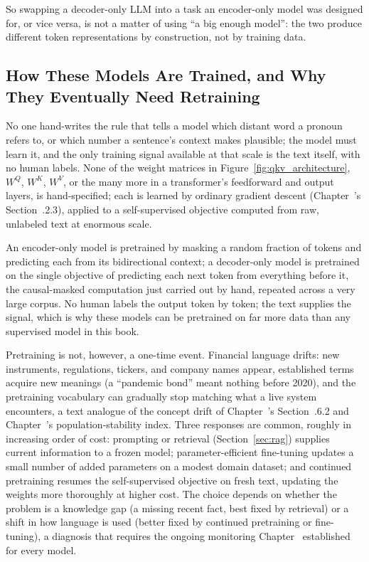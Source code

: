\documentclass[../ai_in_finance]{subfiles}
\begin{document}
So swapping a decoder-only LLM into a task an encoder-only model was designed for, or vice versa, is not a matter of using ``a big enough model'': the two produce different token representations by construction, not by training data.

\subsection{How These Models Are Trained, and Why They Eventually Need Retraining}
\label{sec:transformer-training}

No one hand-writes the rule that tells a model which distant word a pronoun refers to, or which number a sentence's context makes plausible; the model must learn it, and the only training signal available at that scale is the text itself, with no human labels. None of the weight matrices in Figure~\ref{fig:qkv_architecture}, $W^Q$, $W^K$, $W^V$, or the many more in a transformer's feedforward and output layers, is hand-specified; each is learned by ordinary gradient descent (Chapter~'s Section~.2.3), applied to a self-supervised objective computed from raw, unlabeled text at enormous scale.

An encoder-only model is pretrained by masking a random fraction of tokens and predicting each from its bidirectional context; a decoder-only model is pretrained on the single objective of predicting each next token from everything before it, the causal-masked computation just carried out by hand, repeated across a very large corpus. No human labels the output token by token; the text supplies the signal, which is why these models can be pretrained on far more data than any supervised model in this book.

Pretraining is not, however, a one-time event. Financial language drifts: new instruments, regulations, tickers, and company names appear, established terms acquire new meanings (a ``pandemic bond'' meant nothing before 2020), and the pretraining vocabulary can gradually stop matching what a live system encounters, a text analogue of the concept drift of Chapter~'s Section~.6.2 and Chapter~'s population-stability index. Three responses are common, roughly in increasing order of cost: prompting or retrieval (Section~\ref{sec:rag}) supplies current information to a frozen model; parameter-efficient fine-tuning updates a small number of added parameters on a modest domain dataset; and continued pretraining resumes the self-supervised objective on fresh text, updating the weights more thoroughly at higher cost. The choice depends on whether the problem is a knowledge gap (a missing recent fact, best fixed by retrieval) or a shift in how language is used (better fixed by continued pretraining or fine-tuning), a diagnosis that requires the ongoing monitoring Chapter~ established for every model.
\end{document}
